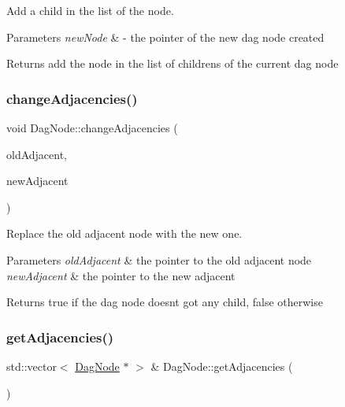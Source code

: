 Add a child in the list of the node. 


\begin{DoxyParams}{Parameters}
{\em new\+Node} & -\/ the pointer of the new dag node created \\
\hline
\end{DoxyParams}
\begin{DoxyReturn}{Returns}
add the node in the list of childrens of the current dag node 
\end{DoxyReturn}
\mbox{\label{classDagNode_a5f70b777657539694e124557fcd35be1}} 
\subsubsection{\texorpdfstring{change\+Adjacencies()}{changeAdjacencies()}}
{\footnotesize\ttfamily void Dag\+Node\+::change\+Adjacencies (\begin{DoxyParamCaption}\item[{\hyperlink{classDagNode}{Dag\+Node} $\ast$}]{old\+Adjacent,  }\item[{\hyperlink{classDagNode}{Dag\+Node} $\ast$}]{new\+Adjacent }\end{DoxyParamCaption})\hspace{0.3cm}{\ttfamily [inline]}}



Replace the old adjacent node with the new one. 


\begin{DoxyParams}{Parameters}
{\em old\+Adjacent} & the pointer to the old adjacent node \\
\hline
{\em new\+Adjacent} & the pointer to the new adjacent \\
\hline
\end{DoxyParams}
\begin{DoxyReturn}{Returns}
true if the dag node doesn\textquotesingle{}t got any child, false otherwise 
\end{DoxyReturn}
\mbox{\label{classDagNode_abc1bd7d5b2a39d85cd7bd924cdc984b3}} 
\subsubsection{\texorpdfstring{get\+Adjacencies()}{getAdjacencies()}}
{\footnotesize\ttfamily std\+::vector$<$ \hyperlink{classDagNode}{Dag\+Node} $\ast$ $>$ \& Dag\+Node\+::get\+Adjacencies (\begin{DoxyParamCaption}{ }\end{DoxyParamCaption})\hspace{0.3cm}{\ttfamily [inline]}}



